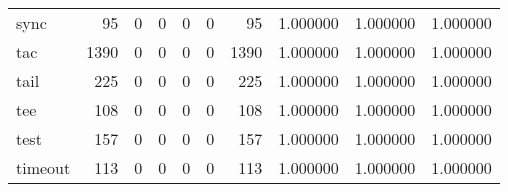 \begin{tabular}{lrrrrrrrrr}
sync      &                                                 95 &                                                  0 &                                                  0 &                                                  0 &                                                  0 &                                                 95 &                                           1.000000 &                               1.000000 &                             1.000000 \\
tac       &                                               1390 &                                                  0 &                                                  0 &                                                  0 &                                                  0 &                                               1390 &                                           1.000000 &                               1.000000 &                             1.000000 \\
tail      &                                                225 &                                                  0 &                                                  0 &                                                  0 &                                                  0 &                                                225 &                                           1.000000 &                               1.000000 &                             1.000000 \\
tee       &                                                108 &                                                  0 &                                                  0 &                                                  0 &                                                  0 &                                                108 &                                           1.000000 &                               1.000000 &                             1.000000 \\
test      &                                                157 &                                                  0 &                                                  0 &                                                  0 &                                                  0 &                                                157 &                                           1.000000 &                               1.000000 &                             1.000000 \\
timeout   &                                                113 &                                                  0 &                                                  0 &                                                  0 &                                                  0 &                                                113 &                                           1.000000 &                               1.000000 &                             1.000000 \\

\end{tabular}

